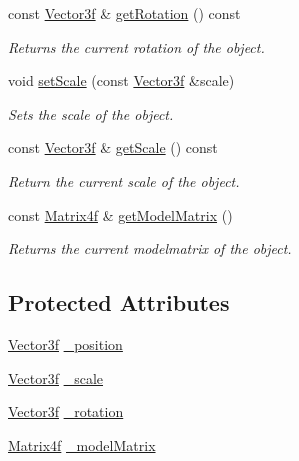 \begin{DoxyCompactItemize}
const \hyperlink{namespaceburn_afdd7cfb352b9612432faf6947b6fff74}{Vector3f} \& \hyperlink{classburn_1_1_transformable_af16b32fb2143e7a459b8446e898c4359}{get\-Rotation} () const 
\begin{DoxyCompactList}\small\item\em Returns the current rotation of the object. \end{DoxyCompactList}\item 
void \hyperlink{classburn_1_1_transformable_a7e73a5706524923d4fc6c13990b7f575}{set\-Scale} (const \hyperlink{namespaceburn_afdd7cfb352b9612432faf6947b6fff74}{Vector3f} \&scale)
\begin{DoxyCompactList}\small\item\em Sets the scale of the object. \end{DoxyCompactList}\item 
const \hyperlink{namespaceburn_afdd7cfb352b9612432faf6947b6fff74}{Vector3f} \& \hyperlink{classburn_1_1_transformable_a62d533b4a7d03b3b2aa9c783cb7cb061}{get\-Scale} () const 
\begin{DoxyCompactList}\small\item\em Return the current scale of the object. \end{DoxyCompactList}\item 
const \hyperlink{namespaceburn_a643e9d2ffceb4304e3755a100268a7a3}{Matrix4f} \& \hyperlink{classburn_1_1_transformable_ac77cb89c24baf4eaf730b478b2f9b2b5}{get\-Model\-Matrix} ()
\begin{DoxyCompactList}\small\item\em Returns the current modelmatrix of the object. \end{DoxyCompactList}\end{DoxyCompactItemize}
\subsection*{Protected Attributes}
\begin{DoxyCompactItemize}
\item 
\hyperlink{namespaceburn_afdd7cfb352b9612432faf6947b6fff74}{Vector3f} \hyperlink{classburn_1_1_transformable_a1cb1a52f8518c7c2f50e45d8cd902767}{\-\_\-position}
\item 
\hyperlink{namespaceburn_afdd7cfb352b9612432faf6947b6fff74}{Vector3f} \hyperlink{classburn_1_1_transformable_a80e5ca4d02b2d58593b751b040e86492}{\-\_\-scale}
\item 
\hyperlink{namespaceburn_afdd7cfb352b9612432faf6947b6fff74}{Vector3f} \hyperlink{classburn_1_1_transformable_ad62e417f44d78cbeedfd30e62c1b896d}{\-\_\-rotation}
\item 
\hyperlink{namespaceburn_a643e9d2ffceb4304e3755a100268a7a3}{Matrix4f} \hyperlink{classburn_1_1_transformable_a6a06bcec86a7f2e70eba6fe7e8bbe61c}{\-\_\-model\-Matrix}
\end{DoxyCompactItemize}


